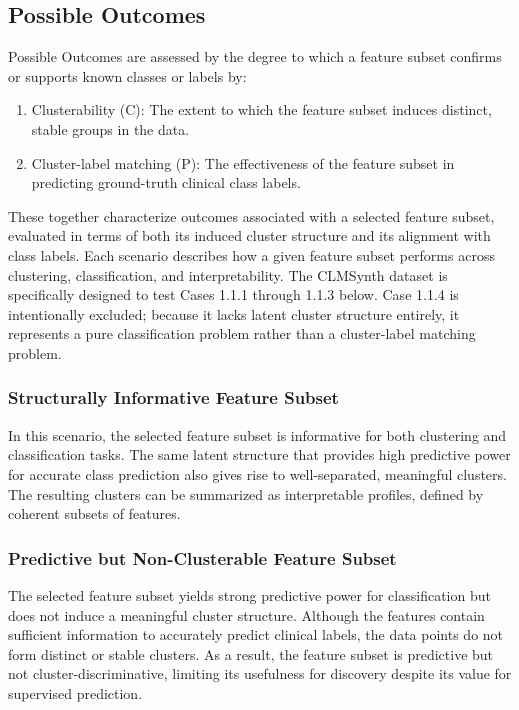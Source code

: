 \documentclass[a4paper,12pt]{article}
\begin{document}
\subsection{Possible Outcomes}
Possible Outcomes are assessed by the degree to which a feature subset confirms or supports known classes or labels by:
\begin{enumerate}
    \item Clusterability (C): The extent to which the feature subset induces distinct, stable groups in the data.
    \item Cluster-label matching (P): The effectiveness of the feature subset in predicting ground-truth clinical class labels.
\end{enumerate}
\vspace{1em}
\noindent
These together characterize outcomes associated with a selected feature subset, evaluated in terms of both its induced cluster structure and its alignment with class labels. Each scenario describes how a given feature subset performs across clustering, classification, and interpretability.
\noindent
The CLMSynth dataset is specifically designed to test Cases 1.1.1 through 1.1.3 below. Case 1.1.4 is intentionally excluded; because it lacks latent cluster structure entirely, it represents a pure classification problem rather than a cluster-label matching problem.
\newpage
\subsubsection{Structurally Informative Feature Subset}
In this scenario, the selected feature subset is informative for both clustering
and classification tasks. The same latent structure that provides high predictive 
power for accurate class prediction also gives rise to well-separated, meaningful 
clusters. The resulting clusters can be summarized as interpretable profiles, 
defined by coherent subsets of features.

\subsubsection{Predictive but Non-Clusterable Feature Subset}
The selected feature subset yields strong predictive power for classification but
does not induce a meaningful cluster structure. Although the features contain
sufficient information to accurately predict clinical labels, the data points
do not form distinct or stable clusters. As a result, the feature subset is
predictive but not cluster-discriminative, limiting its usefulness for discovery
despite its value for supervised prediction.
\end{document}
